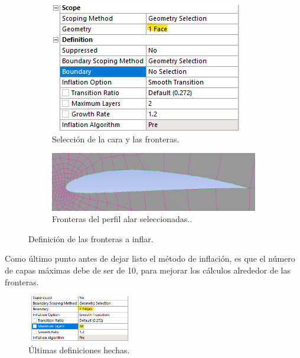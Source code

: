 \documentclass[12pt, letterpaper]{article}
\begin{document}
\begin{figure}[H]
	\centering
	\begin{subfigure}[b]{0.49\linewidth}
		\includegraphics[width=\linewidth]{9.png}
		\caption{Selección de la cara y las fronteras.}
	\end{subfigure}
	\begin{subfigure}[b]{0.49\linewidth}
		\includegraphics[width=\linewidth]{10.png}
		\caption{Fronteras del perfil alar seleccionadas..}
	\end{subfigure}
	\caption{Definición de las fronteras a inflar.}
\end{figure}

Como último punto antes de dejar listo el método de inflación, es que el número de capas máximas debe de ser de 10, para mejorar los cálculos alrededor de las fronteras.

\begin{figure}[H]
	\centering
	\includegraphics[width=0.4\textwidth]{11.png}
	\caption{Últimas definiciones hechas.}
\end{figure}
\end{document}
